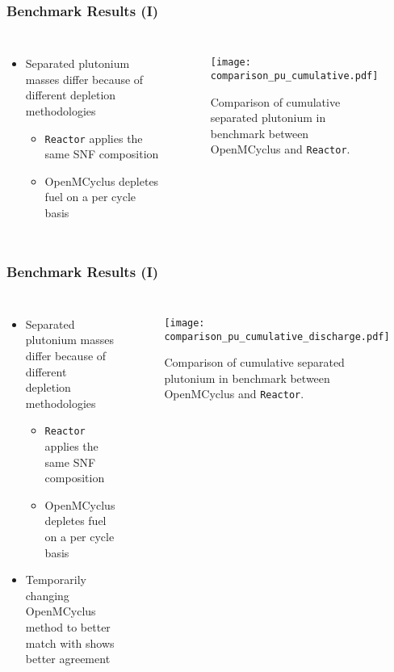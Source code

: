 \begin{frame}
    \frametitle{Benchmark Results (I)}
    \begin{columns}
        \column[t]{3.5cm}
        \begin{itemize}
            \item Separated plutonium masses differ because of 
                  different depletion methodologies
            \begin{itemize}
                \item<2-> \Cycamore \texttt{Reactor} applies the same 
                          SNF composition
                \item<2-> OpenMCyclus depletes fuel on a per cycle basis
            \end{itemize}
        \end{itemize}
        \column[t]{6.5cm}
        \begin{figure}
            \centering 
            \texttt{[image: comparison\_pu\_cumulative.pdf]}
            \caption{Comparison of cumulative separated plutonium in benchmark between 
            OpenMCyclus and \Cycamore \texttt{Reactor}.}
        \end{figure}
    \end{columns}
\end{frame}

\begin{frame}
    \frametitle{Benchmark Results (I)}
    \begin{columns}
        \column[t]{4cm}
        \begin{itemize}
            \item Separated plutonium masses differ because of 
                  different depletion methodologies
                  \begin{itemize}
                    \item \Cycamore \texttt{Reactor} applies the same 
                          SNF composition
                    \item OpenMCyclus depletes fuel on a per cycle basis
                  \end{itemize}
            \item Temporarily changing OpenMCyclus method to better 
                  match with \Cycamore shows better agreement
        \end{itemize}
        \column[t]{6.5cm}
        \begin{figure}
            \centering 
            \texttt{[image: comparison\_pu\_cumulative\_discharge.pdf]}
            \caption{Comparison of cumulative separated plutonium in benchmark between 
            OpenMCyclus and \Cycamore \texttt{Reactor}.}
        \end{figure}
    \end{columns}
\end{frame}

